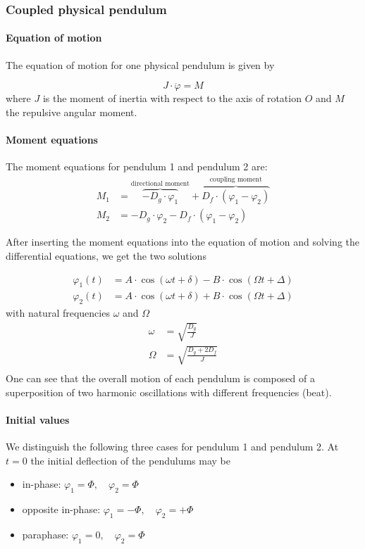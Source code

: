 \documentclass{scrreprt}
\renewcommand{\phi}{\varphi}
\begin{document}
\subsubsection{Coupled physical pendulum}

\paragraph{Equation of motion}
The equation of motion for one physical pendulum is given by

\begin{equation}
J\cdot \ddot{\phi} = M
\end{equation}
where $J$ is the moment of inertia with respect to the axis of rotation $O$ and $M$ the repulsive angular moment.

\paragraph{Moment equations}
The moment equations for pendulum 1 and pendulum 2 are:
\begin{align}
M_1 &= \overbrace{-D_g\cdot \phi_1}^{\text{directional moment}} + \overbrace{D_f \cdot (\phi_1 - \phi_2)}^{\text{coupling moment}}  \\
M_2 &= -D_g\cdot \phi_2 - D_f \cdot (\phi_1 - \phi_2)
\end{align}

After inserting the moment equations into the equation of motion and solving the differential equations, we get the two solutions

\begin{align}
\phi_1(t) &= A \cdot \cos{(\omega t + \delta)} - B \cdot \cos{(\Omega t + \Delta)}\\
\phi_2(t) &= A \cdot \cos{(\omega t + \delta)} + B \cdot \cos{(\Omega t + \Delta)}
\end{align}
with natural frequencies $\omega$ and $\Omega$
\begin{align}
\omega &= \sqrt{\frac{D_g}{J}}\\
\Omega &= \sqrt{\frac{D_g+2 D_f}{J}}\\
\end{align}
One can see that the overall motion of each pendulum is composed of a superposition of two harmonic oscillations with different frequencies (beat).

\paragraph{Initial values}
We distinguish the following three cases for pendulum 1 and pendulum 2. At $t=0$ the initial deflection of the pendulums may be
\begin{itemize}
\item in-phase: $\phi_1 = \Phi, \quad \phi_2 = \Phi$
\item opposite in-phase: $\phi_1 = -\Phi, \quad \phi_2 = +\Phi$
\item paraphase: $\phi_1 = 0, \quad \phi_2 = \Phi$
\end{itemize}
\end{document}
